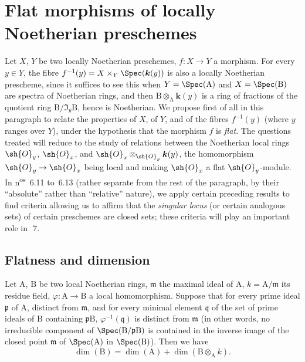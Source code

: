 \section{Flat morphisms of locally Noetherian preschemes}
\label{section:IV.6}

Let $X$, $Y$ be two locally Noetherian preschemes, $f:X\to Y$ a morphism.
For every $y\in Y$, the fibre $f^{-1}(y)=X\times_Y\Spec(\boldsymbol{k}(y))$ is also a locally Noetherian prescheme, since it suffices to see this when $Y=\Spec(\mathrm{A})$ and $X=\Spec(\mathrm{B})$ are spectra of Noetherian rings, and then $\mathrm{B}\otimes_\mathrm{A}\boldsymbol{k}(y)$ is a ring of fractions of the quotient ring $\mathrm{B}/\mathfrak{I}_y\mathrm{B}$, hence is Noetherian.
We propose first of all in this paragraph to relate the properties of $X$, of $Y$, and of the fibres $f^{-1}(y)$ (where $y$ ranges over $Y$), under the hypothesis that the morphism $f$ is \emph{flat}.
The questions treated will reduce to the study of relations between the Noetherian local rings $\sh{O}_y$, $\sh{O}_x$, and $\sh{O}_x\otimes_{\sh{O}_y}\boldsymbol{k}(y)$, the homomorphism $\sh{O}_y\to\sh{O}_x$ being local and making $\sh{O}_x$ a flat $\sh{O}_y$-module.
In n\textsuperscript{os}~6.11
to~6.13 (rather separate from the rest of the paragraph, by their ``absolute'' rather than ``relative'' nature), we apply certain preceding results to find criteria allowing us to affirm that the \emph{singular locus} (or certain analogous sets) of certain preschemes are closed sets; these criteria will play an important role in~\textsection\,7.

\subsection{Flatness and dimension}
\label{subsection:IV.6.1}

\begin{proposition}[6.1.1]
\label{IV.6.1.1}
Let $\mathrm{A}$, $\mathrm{B}$ be two local Noetherian rings, $\mathfrak{m}$ the maximal ideal of $\mathrm{A}$, $k=\mathrm{A}/\mathfrak{m}$ its residue field, $\varphi:\mathrm{A}\to\mathrm{B}$ a local homomorphism.
Suppose that for every prime ideal $\mathfrak{p}$ of $\mathrm{A}$, distinct from $\mathfrak{m}$, and for every minimal element $\mathfrak{q}$ of the set of prime ideals of $\mathrm{B}$ containing $\mathfrak{p}\mathrm{B}$, $\varphi^{-1}(\mathfrak{q})$ is distinct from $\mathfrak{m}$ (in other words, no irreducible component of $\Spec(\mathrm{B}/\mathfrak{p}\mathrm{B})$ is contained in the inverse image of the closed point $\mathfrak{m}$ of $\Spec(\mathrm{A})$ in $\Spec(\mathrm{B})$).
Then we have
\begin{equation}
  \dim(\mathrm{B})=\dim(\mathrm{A})+\dim(\mathrm{B}\otimes_\mathrm{A} k).
  \tag{6.1.1.1}
\end{equation}
\end{proposition}

